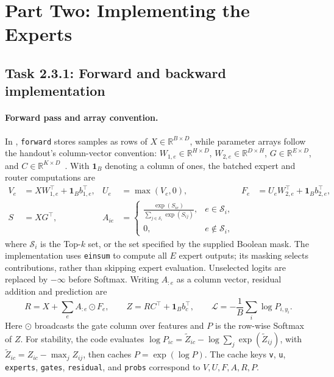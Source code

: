 \section{Part Two: Implementing the Experts}
\subsection{Task 2.3.1: Forward and backward implementation}
\paragraph{Forward pass and array convention.}
In , \texttt{forward} stores samples as rows of
$X\in\mathbb R^{B\times D}$, while parameter arrays follow the handout's
column-vector convention: $W_{1,e}\in\mathbb R^{H\times D}$,
$W_{2,e}\in\mathbb R^{D\times H}$, $G\in\mathbb R^{E\times D}$, and
$C\in\mathbb R^{K\times D}$~\citep{handout}. With $\mathbf1_B$ denoting a
column of ones, the batched expert and router computations are
\begin{align}
V_e&=XW_{1,e}^{\top}+\mathbf1_B b_{1,e}^{\top}, &
U_e&=\max(V_e,0), &
F_e&=U_eW_{2,e}^{\top}+\mathbf1_B b_{2,e}^{\top},\\
S&=XG^{\top}, &
A_{ie}&=\begin{cases}
\displaystyle\frac{\exp(S_{ie})}{\sum_{j\in\mathcal S_i}\exp(S_{ij})},&e\in\mathcal S_i,\\
0,&e\notin\mathcal S_i,
\end{cases}
\end{align}
where $\mathcal S_i$ is the Top-$k$ set, or the set specified by the supplied
Boolean mask. The implementation uses \texttt{einsum} to compute all $E$
expert outputs; its masking selects contributions, rather than skipping expert
evaluation. Unselected logits are replaced by $-\infty$ before Softmax.
Writing $A_{:e}$ as a column vector, residual addition and prediction are
\begin{equation}
R=X+\sum_e A_{:e}\odot F_e,\qquad
Z=RC^{\top}+\mathbf1_B b_c^{\top},\qquad
\mathcal L=-\frac1B\sum_i\log P_{i,y_i}.
\end{equation}
Here $\odot$ broadcasts the gate column over features and $P$ is the row-wise
Softmax of $Z$. For stability, the code evaluates
$\log P_{ic}=\widetilde Z_{ic}-\log\sum_j\exp(\widetilde Z_{ij})$, with
$\widetilde Z_{ic}=Z_{ic}-\max_j Z_{ij}$, then caches $P=\exp(\log P)$.
The cache keys \texttt{v}, \texttt{u}, \texttt{experts}, \texttt{gates},
\texttt{residual}, and \texttt{probs} correspond to $V,U,F,A,R,P$.

